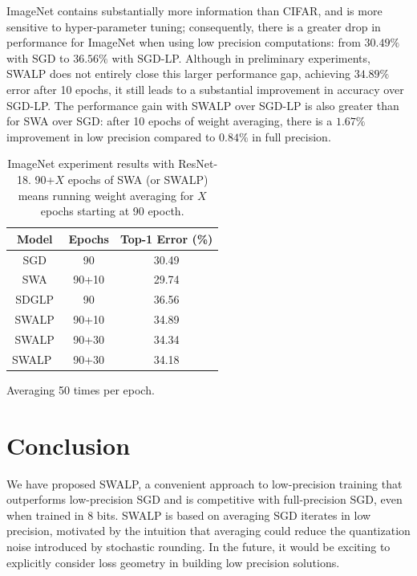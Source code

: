 \documentclass{article}
\begin{document}
ImageNet contains substantially more information than CIFAR, and is more sensitive to hyper-parameter tuning; consequently, there is a greater drop in performance for ImageNet when using low precision computations: from $30.49\%$ with SGD to $36.56\%$ with SGD-LP. 
Although in preliminary experiments, SWALP does not entirely close this larger performance gap, achieving $34.89\%$ error after 10 epochs, it still leads to a substantial improvement in accuracy over SGD-LP. The performance gain with SWALP over SGD-LP is also greater than for SWA over SGD: after 10 epochs of weight averaging, there is a $1.67\%$ improvement in low precision compared to $0.84\%$ in full precision.

\begin{table}[t]
\centering
\caption{
ImageNet experiment results with ResNet-18. 
90+$X$ epochs of SWA (or SWALP) means running weight averaging for $X$ epochs starting at 90 epocth.
}\label{table:imagenet}
\begin{threeparttable}
\begin{tabular}{@{}ccc@{}}
\toprule
Model               & Epochs & Top-1 Error (\%) \\
\midrule
SGD                 & 90     & 30.49               \\
SWA                 & 90+10    & 29.74               \\ 
\midrule
SDGLP               & 90     & 36.56               \\ 
SWALP               & 90+10    & 34.89               \\ 
SWALP               & 90+30    & 34.34               \\ 
SWALP~\tnote{\dag}  & 90+30    & 34.18               \\ 
\bottomrule
\end{tabular}
\begin{tablenotes}
	\item[\dag] Averaging 50 times per epoch. 
\end{tablenotes}
\end{threeparttable}
\vspace{-2mm}
\end{table}

\vspace{-1mm}
\section{Conclusion}
\label{sec:concl}
We have proposed SWALP, a convenient approach to low-precision training that outperforms low-precision SGD and is competitive with full-precision SGD, even when trained in 8 bits. 
SWALP is based on averaging SGD iterates in low precision, motivated by the intuition that averaging could reduce the quantization noise introduced by stochastic rounding.
In the future, it would be exciting to explicitly consider loss geometry in building low precision solutions.
\end{document}
